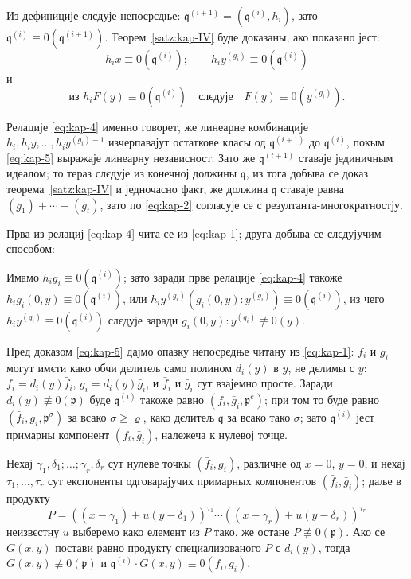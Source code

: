 \documentclass[11pt]{article}
\theoremstyle{plain}
\begin{document}
Из дефиниције слєдује непосрєдње:
$\mathfrak{q}^{(i+1)} = (\mathfrak{q}^{(i)}, h_{i})$, зато
$\mathfrak{q}^{(i)} \equiv 0(\mathfrak{q}^{(i+1)})$.
Теорем~\ref{satz:kap-IV} буде доказаны, ако показано јест:
\begin{equation}\label{eq:kap-4}
h_{i}x \equiv 0(\mathfrak{q}^{(i)}); \qquad
h_{i}y^{(g_{i})} \equiv 0(\mathfrak{q}^{(i)})
\end{equation}
и
\begin{equation}\label{eq:kap-5}
\text{из } h_{i}F(y) \equiv 0(\mathfrak{q}^{(i)})
\quad \text{слєдује} \quad F(y) \equiv 0(y^{(g_{i})}).
\end{equation}

Релације \eqref{eq:kap-4} именно говорет, же линеарне комбинације
$h_{i}, h_{i}y, \ldots, h_{i}y^{(g_{i})-1}$ изчерпавајут
остаткове класы од $\mathfrak{q}^{(i+1)}$ до
$\mathfrak{q}^{(i)}$, покым \eqref{eq:kap-5} выражаје линеарну
независност. Зато же $\mathfrak{q}^{(t+1)}$ ставаје јединичным
идеалом; то тераз слєдује из конечној должины $\mathfrak{q}$,
из тога добыва се доказ теорема~\ref{satz:kap-IV} и једночасно
факт, же должина $\mathfrak{q}$ ставаје равна
$(g_{1}) + \cdots + (g_{t})$, зато по \eqref{eq:kap-2} согласује се
с резултанта-многократностју.

Прва из релациј \eqref{eq:kap-4} чита се из \eqref{eq:kap-1};
друга добыва се слєдујучим способом:

Имамо $h_{i}g_{i} \equiv 0(\mathfrak{q}^{(i)})$; зато заради прве
релације \eqref{eq:kap-4} такоже
$h_{i}g_{i}(0,y) \equiv 0(\mathfrak{q}^{(i)})$, или
$h_{i}y^{(g_{i})}(g_{i}(0,y):y^{(g_{i})}) \equiv 0(\mathfrak{q}^{(i)})$,
из чего $h_{i}y^{(g_{i})} \equiv 0(\mathfrak{q}^{(i)})$
слєдује заради $g_{i}(0,y):y^{(g_{i})} \not\equiv 0(y)$.

Пред доказом \eqref{eq:kap-5} дајмо опазку непосрєдње читану из
\eqref{eq:kap-1}: $f_{i}$ и $g_{i}$ могут имєти како обчи дєлитељ
само полином $d_{i}(y)$ в $y$, не дєлимы с $y$:
$f_{i} = d_{i}(y)\bar{f}_{i}$, $g_{i} = d_{i}(y)\bar{g}_{i}$, и
$\bar{f}_{i}$ и $\bar{g}_{i}$ сут взајемно просте. Заради
$d_{i}(y) \not\equiv 0(\mathfrak{p})$ буде $\mathfrak{q}^{(i)}$
такоже равно $(\bar{f}_{i}, \bar{g}_{i}, \mathfrak{p}^{e})$;
при том то буде равно
$(\bar{f}_{i}, \bar{g}_{i}, \mathfrak{p}^{\sigma})$ за всако
$\sigma \geq \varrho$, како дєлитељ $\mathfrak{q}$ за всако
тако $\sigma$; зато $\mathfrak{q}^{(i)}$ јест примарны компонент
$(\bar{f}_{i}, \bar{g}_{i})$, належеча к нулевој точце.

Нехај $\gamma_{1}, \delta_{1}; \ldots; \gamma_{r}, \delta_{r}$ сут
нулеве точкы $(\bar{f}_{i}, \bar{g}_{i})$, различне од
$x = 0$, $y = 0$, и нехај $\tau_{1}, \ldots, \tau_{r}$ сут експоненты
одговарајучих примарных компонентов $(\bar{f}_{i}, \bar{g}_{i})$;
даље в продукту
\[
P = ((x-\gamma_{1}) + u(y-\delta_{1}))^{\tau_{1}} \cdots
((x-\gamma_{r}) + u(y-\delta_{r}))^{\tau_{r}}
\]
неизвєстну $u$ выберемо како елемент из $P$ тако, же остане
$P \not\equiv 0(\mathfrak{p})$. Ако се $G(x,y)$ постави равно
продукту специализованого $P$ с $d_{i}(y)$, тогда
$G(x,y) \not\equiv 0(\mathfrak{p})$ и
$\mathfrak{q}^{(i)} \cdot G(x,y) \equiv 0(f_{i}, g_{i})$.
\end{document}

